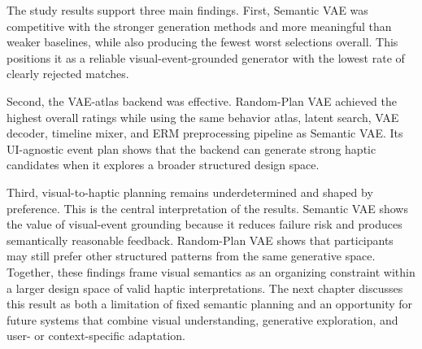The study results support three main findings. First, Semantic VAE was competitive with the stronger generation methods and more meaningful than weaker baselines, while also producing the fewest worst selections overall. This positions it as a reliable visual-event-grounded generator with the lowest rate of clearly rejected matches.

Second, the VAE-atlas backend was effective. Random-Plan VAE achieved the highest overall ratings while using the same behavior atlas, latent search, VAE decoder, timeline mixer, and ERM preprocessing pipeline as Semantic VAE. Its UI-agnostic event plan shows that the backend can generate strong haptic candidates when it explores a broader structured design space.

Third, visual-to-haptic planning remains underdetermined and shaped by preference. This is the central interpretation of the results. Semantic VAE shows the value of visual-event grounding because it reduces failure risk and produces semantically reasonable feedback. Random-Plan VAE shows that participants may still prefer other structured patterns from the same generative space. Together, these findings frame visual semantics as an organizing constraint within a larger design space of valid haptic interpretations. The next chapter discusses this result as both a limitation of fixed semantic planning and an opportunity for future systems that combine visual understanding, generative exploration, and user- or context-specific adaptation.
